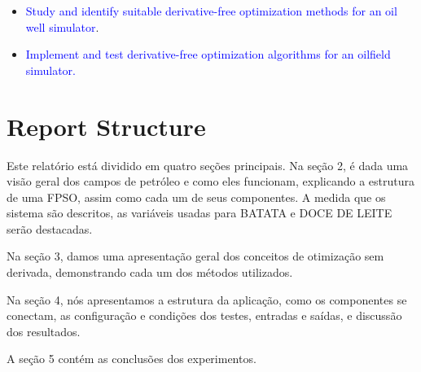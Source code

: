 \begin{itemize}
 \item \textcolor{blue}{Study and identify suitable derivative-free optimization methods for an oil well simulator}.
 
 \item \textcolor{blue}{Implement and test derivative-free optimization algorithms for an oilfield simulator.}
 
\end{itemize}


\section{Report Structure}

Este relatório está dividido em quatro seções principais.
Na seção 2, é dada uma visão geral dos campos de petróleo e como eles funcionam, explicando a estrutura de uma FPSO, assim como cada um de seus componentes. A medida que os sistema são descritos, as variáveis usadas para BATATA e DOCE DE LEITE serão destacadas.

Na seção 3, damos uma apresentação geral dos conceitos de otimização sem derivada, demonstrando cada um dos métodos utilizados.

Na seção 4, nós apresentamos a estrutura da aplicação, como os componentes se conectam, as configuração e condições dos testes, entradas e saídas, e discussão dos resultados.

A seção 5 contém as conclusões dos experimentos.

 

